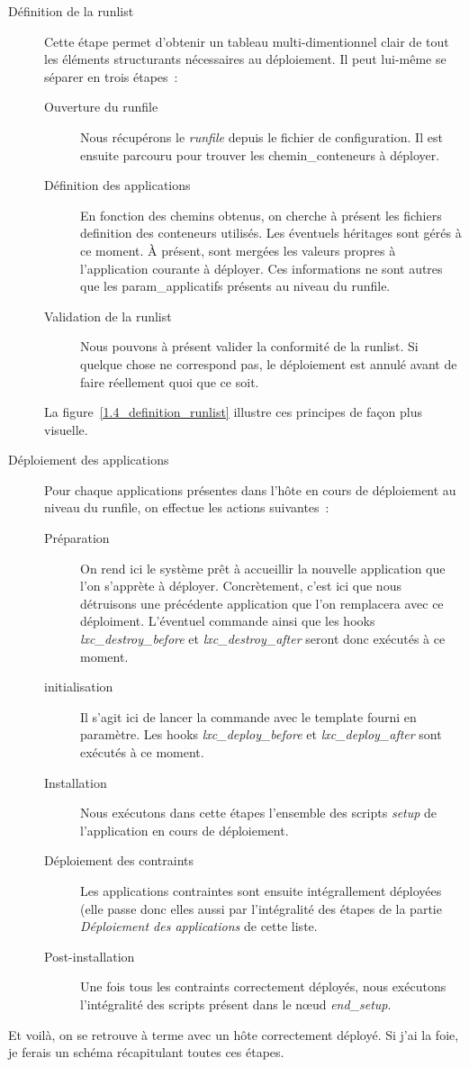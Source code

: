\begin{description}
	\item[Définition de la \gls{runlist}]
		Cette étape permet d'obtenir un tableau multi-dimentionnel clair de tout les éléments structurants nécessaires au déploiement.
		Il peut lui-même se séparer en trois étapes~:
		\begin{description}
			\item[Ouverture du \gls{runfile}]
				Nous récupérons le \emph{runfile} depuis le fichier de configuration.
				Il est ensuite parcouru pour trouver les \glspl{chemin_conteneur} à déployer.
			\item[Définition des applications]
				En fonction des chemins obtenus, on cherche à présent les fichiers \gls{definition} des conteneurs utilisés.
				Les éventuels héritages sont gérés à ce moment.
				À présent, sont mergées les valeurs propres à l'application courante à déployer.
				Ces informations ne sont autres que les \gls{param_applicatifs} présents au niveau du runfile.
			\item[Validation de la runlist]
				Nous pouvons à présent valider la conformité de la runlist.
				Si quelque chose ne correspond pas, le déploiement est annulé avant de faire réellement quoi que ce soit.
		\end{description}
		La figure~\ref{1.4_definition_runlist} illustre ces principes de façon plus visuelle.
	\item[Déploiement des applications]
		Pour chaque applications présentes dans l'hôte en cours de déploiement au niveau du runfile, on effectue les actions suivantes~:
			\begin{description}
				\item[Préparation]
					On rend ici le système prêt à accueillir la nouvelle application que l'on s'apprète à déployer.
					Concrètement, c'est ici que nous détruisons une précédente application que l'on remplacera avec ce déploiment.
					L'éventuel commande  ainsi que les hooks \emph{lxc\_destroy\_before} et \emph{lxc\_destroy\_after} seront donc exécutés à ce moment.
				\item[\Gls{initialisation}]
					Il s'agit ici de lancer la commande  avec le template fourni en paramètre.
					Les hooks \emph{lxc\_deploy\_before} et \emph{lxc\_deploy\_after} sont exécutés à ce moment.
				\item[Installation]
					Nous exécutons dans cette étapes l'ensemble des scripts \emph{setup} de l'application en cours de déploiement.
				\item[Déploiement des contraints]
					Les applications \gls{contraint}es sont ensuite intégrallement déployées (elle passe donc elles aussi par l'intégralité des étapes de la partie \emph{Déploiement des applications} de cette liste.
				\item[Post-installation]
					Une fois tous les contraints correctement déployés, nous exécutons l'intégralité des scripts présent dans le nœud \emph{end\_setup}.
			\end{description}
\end{description}
Et voilà, on se retrouve à terme avec un hôte correctement déployé.
Si j'ai la foie, je ferais un schéma récapitulant toutes ces étapes.

